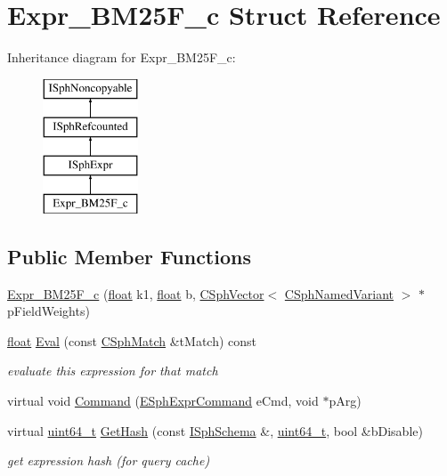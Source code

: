 \hypertarget{structExpr__BM25F__c}{\section{Expr\-\_\-\-B\-M25\-F\-\_\-c Struct Reference}
\label{structExpr__BM25F__c}
}
Inheritance diagram for Expr\-\_\-\-B\-M25\-F\-\_\-c\-:\begin{figure}[H]
\begin{center}
\leavevmode
\includegraphics[height=4.000000cm]{structExpr__BM25F__c}
\end{center}
\end{figure}
\subsection*{Public Member Functions}
\begin{DoxyCompactItemize}
\item 
\hyperlink{structExpr__BM25F__c_a81988daba2e884e03f49a40ecfa2408b}{Expr\-\_\-\-B\-M25\-F\-\_\-c} (\hyperlink{sphinxexpr_8cpp_a0e0d0739f7035f18f949c2db2c6759ec}{float} k1, \hyperlink{sphinxexpr_8cpp_a0e0d0739f7035f18f949c2db2c6759ec}{float} b, \hyperlink{classCSphVector}{C\-Sph\-Vector}$<$ \hyperlink{structCSphNamedVariant}{C\-Sph\-Named\-Variant} $>$ $\ast$p\-Field\-Weights)
\item 
\hyperlink{sphinxexpr_8cpp_a0e0d0739f7035f18f949c2db2c6759ec}{float} \hyperlink{structExpr__BM25F__c_a724b7386acd13f047cb7ee9665424316}{Eval} (const \hyperlink{classCSphMatch}{C\-Sph\-Match} \&t\-Match) const 
\begin{DoxyCompactList}\small\item\em evaluate this expression for that match \end{DoxyCompactList}\item 
virtual void \hyperlink{structExpr__BM25F__c_a818fb44563f040f9b016f9267645ef53}{Command} (\hyperlink{sphinxexpr_8h_a30be184fb07bd80c271360fc6094c818}{E\-Sph\-Expr\-Command} e\-Cmd, void $\ast$p\-Arg)
\item 
virtual \hyperlink{sphinxstd_8h_aaa5d1cd013383c889537491c3cfd9aad}{uint64\-\_\-t} \hyperlink{structExpr__BM25F__c_a9065188f81d33255f53f7c2c72f8602c}{Get\-Hash} (const \hyperlink{classISphSchema}{I\-Sph\-Schema} \&, \hyperlink{sphinxstd_8h_aaa5d1cd013383c889537491c3cfd9aad}{uint64\-\_\-t}, bool \&b\-Disable)
\begin{DoxyCompactList}\small\item\em get expression hash (for query cache) \end{DoxyCompactList}\end{DoxyCompactItemize}
